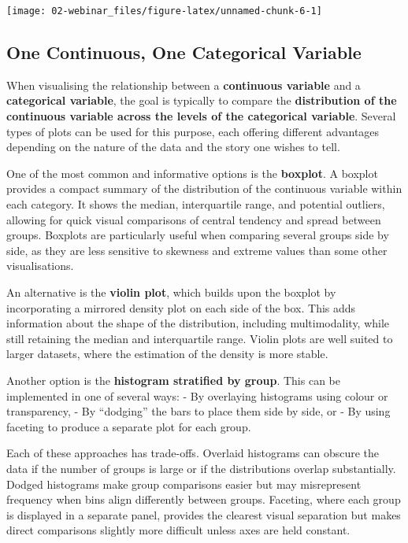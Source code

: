 \documentclass[
  oneside]{book}
\begin{document}
\begin{center}\texttt{[image: 02-webinar\_files/figure-latex/unnamed-chunk-6-1]} \end{center}

\subsection{One Continuous, One Categorical Variable}\label{one-continuous-one-categorical-variable}

When visualising the relationship between a \textbf{continuous variable} and a \textbf{categorical variable}, the goal is typically to compare the \textbf{distribution of the continuous variable across the levels of the categorical variable}. Several types of plots can be used for this purpose, each offering different advantages depending on the nature of the data and the story one wishes to tell.

One of the most common and informative options is the \textbf{boxplot}. A boxplot provides a compact summary of the distribution of the continuous variable within each category. It shows the median, interquartile range, and potential outliers, allowing for quick visual comparisons of central tendency and spread between groups. Boxplots are particularly useful when comparing several groups side by side, as they are less sensitive to skewness and extreme values than some other visualisations.

An alternative is the \textbf{violin plot}, which builds upon the boxplot by incorporating a mirrored density plot on each side of the box. This adds information about the shape of the distribution, including multimodality, while still retaining the median and interquartile range. Violin plots are well suited to larger datasets, where the estimation of the density is more stable.

Another option is the \textbf{histogram stratified by group}. This can be implemented in one of several ways:
- By overlaying histograms using colour or transparency,
- By ``dodging'' the bars to place them side by side, or
- By using faceting to produce a separate plot for each group.

Each of these approaches has trade-offs. Overlaid histograms can obscure the data if the number of groups is large or if the distributions overlap substantially. Dodged histograms make group comparisons easier but may misrepresent frequency when bins align differently between groups. Faceting, where each group is displayed in a separate panel, provides the clearest visual separation but makes direct comparisons slightly more difficult unless axes are held constant.
\end{document}
